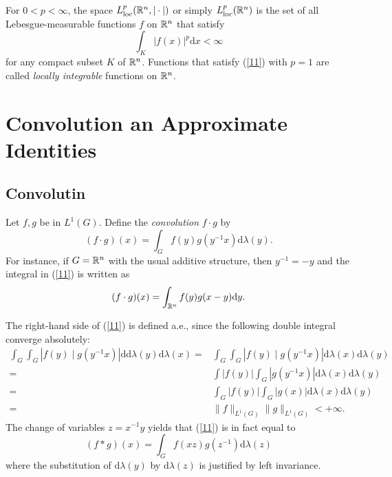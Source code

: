 \begin{definition}
  For $0<p<\infty$, the space $L_{\mathrm{loc}}^{p}(\mathbb{R}^{n},|\cdot |)$ or simply $L_{\mathrm{loc}}^{p}(\mathbb{R}^{n})$ is the set of all Lebesgue-measurable functions $f$ on $\mathbb{R}^{n}$ that satisfy
  \begin{equation}\label{11}
    \int_{K}|f(x)|^{p}\mathrm{d}x<\infty
  \end{equation}
  for any compact subset $K$ of $\mathbb{R}^{n}$. Functions that satisfy (\ref{11}) with $p=1$ are called \textit{locally integrable} functions on $\mathbb{R}^{n}$.
\end{definition}
\section{Convolution an Approximate Identities}
\subsection{Convolutin}
\begin{definition}
  Let $f,g$ be in $L^{1}(G)$. Define the \textit{convolution} $f\cdot g$ by 
  \begin{equation}\label{11}
    (f\cdot g)(x)=\int_{G}f(y)g(y^{-1}x)\mathrm{d}\lambda(y).
  \end{equation}
  For instance, if $G=\mathbb{R}^{n}$ with the usual additive structure, then $y^{-1}=-y$ and the integral in (\ref{11}) is written as 
  \[
    (f\cdot g)(x)=\int_{\mathbb{R}^{n}}f(y)g(x-y)\mathrm{d}y.
  \] 
\end{definition}
The right-hand side of (\ref{11}) is defined a.e., since the following double integral converge absolutely:
\begin{equation}
  \begin{aligned}
    \int_{G}\int_{G}|f(y) \mid g(y^{-1}x)|\mathrm{d}\mathrm{d}\lambda(y)\mathrm{d}\lambda(x) = & \int_G\int_G |f(y) \mid g(y^{-1}x)|\mathrm{d}\lambda(x)\mathrm{d}\lambda(y)\\
    = & \int |f(y)|\int_G |g(y^{-1}x)|\mathrm{d}\lambda(x)\mathrm{d}\lambda(y)\\
    = & \int_{G}|f(y)|\int_G|g(x)|\mathrm{d}\lambda(x)\mathrm{d}\lambda(y)\\
    = & \|f\|_{L^{1}(G)}\|g\|_{L^{1}(G)}<+\infty.
  \end{aligned}
\end{equation}
The change of variables $z=x^{-1}y$ yields that (\ref{11}) is in fact equal to 
\begin{equation}
  (f*g)(x)=\int_{G}f(xz)g(z^{-1})\mathrm{d}\lambda(z)
\end{equation}
where the substitution of $\mathrm{d}\lambda(y)$ by $\mathrm{d}\lambda(z)$ is justified by left invariance.

